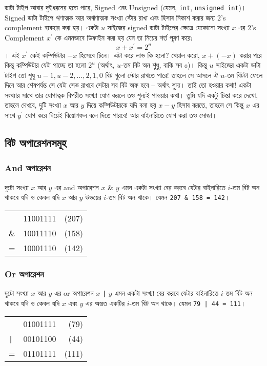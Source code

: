 ডাটা টাইপ আবার দুইধরনের হতে পারে, Signed এবং Unsigned (যেমন, \lstinline{int}, \lstinline{unsigned int})। Signed ডাটা টাইপে ঋণাত্মক আর অঋণাত্মক সংখ্যা স্টোর রাখা এবং হিসাব নিকাশ করার জন্য 2's complement ব্যবহার করা হয়। একটা $u$ সাইজের signed ডাটা টাইপের ক্ষেত্রে যেকোনো সংখ্যা $x$ এর 2's Complement $x^{\prime}$ কে এমনভাবে ডিফাইন করা হয় যেন তা নিচের শর্ত পূরণ করেঃ $$x + x^\prime = 2^u$$। এই $x^\prime$ কেই কম্পিউটার $-x$ হিসেবে চিনে। এটা করে লাভ কি হলো? খেয়াল করো, $x + (-x)$ করার পরে কিন্তু কম্পিউটার যেটা পাচ্ছে তা হলো $2^u$ (অর্থাৎ, $u$-তম বিট অন শুধু, বাকি সব ০)। কিন্তু $u$ সাইজের একটা ডাটা টাইপ তো শুধু $u-1, u-2, \ldots, 2, 1, 0$ বিট গুলো স্টোর রাখতে পারে! তাহলে সে আসলে ঐ $u$-তম বিটটা ফেলে দিবে আর শেষপর্যন্ত সে যেটা সেভ রাখবে সেটার সব বিট অফ হবে -- অর্থাৎ শুন্য। তাই তো হওয়ার কথা! একটা সংখ্যার সাথে তার যোগাত্বক বিপরীত সংখ্যা যোগ করলে তও শুন্যই পাওয়ার কথা। তুমি যদি একটু চিন্তা করে দেখো, তাহলে দেখবে, দুটি সংখ্যা $x$ আর $y$ দিয়ে কম্পিউটারকে যদি বলা হয় $x-y$ হিসাব করতে, তাহলে সে কিন্তু $x$ এর সাথে $y^\prime$ যোগ করে দিয়েই বিয়োগফল বলে দিতে পারবে! আর বাইনারিতে যোগ করা তও সোজা।

\subsection{বিট অপারেশনসমূহ}

\subsubsection{And অপারেশন}
দুটো সংখ্যা $x$ আর $y$ এর and অপারেশন $x$ \& $y$ এমন একটা সংখ্যা বের করবে যেটার বাইনারিতে $i$-তম বিট অন থাকবে যদি ও কেবল যদি $x$ আর $y$ উভয়ের $i$-তম বিট অন থাকে। যেমন \lstinline{207 & 158 = 142}।
\begin{center}
\begin{tabular}{llr}
    & 11001111 & (207)\\
    \& & 10011110 & (158)\\
    \hline
    = & 10001110 & (142)
\end{tabular}
\end{center}

\subsubsection{Or অপারেশন}
দুটো সংখ্যা $x$ আর $y$ এর or অপারেশন $x$ \texttt{|} $y$ এমন একটা সংখ্যা বের করবে যেটার বাইনারিতে $i$-তম বিট অন থাকবে যদি ও কেবল যদি $x$ এবং $y$ এর অন্তত একটির $i$-তম বিট অন থাকে। যেমন \lstinline{79 | 44 = 111}।
\begin{center}
\begin{tabular}{llr}
    & 01001111 & (79)\\
    \texttt{|} & 00101100 & (44)\\
    \hline
    = & 01101111 & (111)
\end{tabular}
\end{center}

